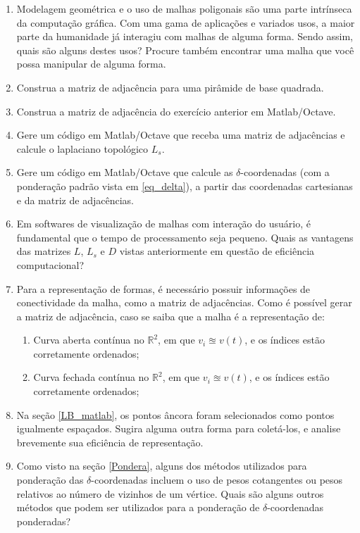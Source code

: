 \begin{enumerate}
    \item Modelagem geométrica e o uso de malhas poligonais são uma parte intrínseca da computação gráfica. Com uma gama de aplicações e variados usos, a maior parte da humanidade já interagiu com malhas de alguma forma. Sendo assim, quais são alguns destes usos? Procure também encontrar uma malha que você possa manipular de alguma forma. 
    
    \item Construa a matriz de adjacência para uma pirâmide de base quadrada.
    
    \item Construa a matriz de adjacência do exercício anterior em Matlab/Octave.
    
    \item Gere um código em Matlab/Octave que receba uma matriz de adjacências e calcule o laplaciano topológico $L_s$.
    
    \item Gere um código em Matlab/Octave que calcule as $\delta$-coordenadas (com a ponderação padrão vista em \ref{eq_delta}), a partir das coordenadas cartesianas e da matriz de adjacências.
    
    \item Em softwares de visualização de malhas com interação do usuário, é fundamental que o tempo de processamento seja pequeno. Quais as vantagens das matrizes $L$, $L_s$ e $D$ vistas anteriormente em questão de eficiência computacional?
    
    \item Para a representação de formas, é necessário possuir informações de conectividade da malha, como a matriz de adjacências. Como é possível gerar a matriz de adjacência, caso se saiba que a malha é a representação de:
    
\begin{enumerate}
    \item Curva aberta contínua no $\mathbb{R}^2$, em que $v_i \approxeq v(t)$, e os índices estão corretamente ordenados;
    
    \item Curva fechada contínua no $\mathbb{R}^2$, em que $v_i \approxeq v(t)$, e os índices estão corretamente ordenados;
\end{enumerate}

    \item Na seção \ref{LB_matlab}, os pontos âncora foram selecionados como pontos igualmente espaçados. Sugira alguma outra forma para coletá-los, e analise brevemente sua eficiência de representação.

    \item Como visto na seção \ref{Pondera}, alguns dos métodos utilizados para ponderação das $\delta$-coordenadas incluem o uso de pesos cotangentes ou pesos relativos ao número de vizinhos de um vértice. Quais são alguns outros métodos que podem ser utilizados para a ponderação de $\delta$-coordenadas ponderadas?

\end{enumerate}

